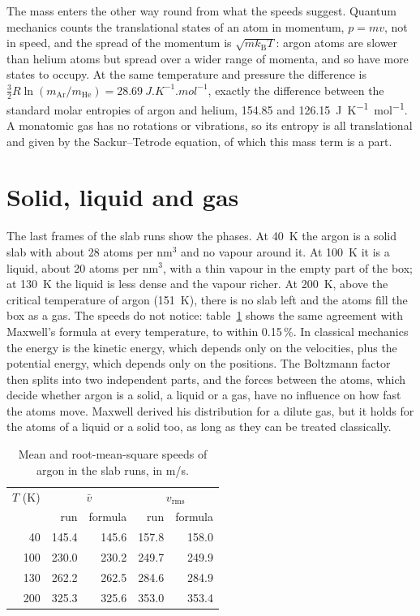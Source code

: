 The mass enters the other way round from what the speeds suggest. Quantum mechanics counts the translational states of an atom in momentum, $p = mv$, not in speed, and the spread of the momentum is $\sqrt{mk_\mathrm{B}T}$: argon atoms are slower than helium atoms but spread over a wider range of momenta, and so have more states to occupy. At the same temperature and pressure the difference is $\tfrac{3}{2}R\ln(m_\mathrm{Ar}/m_\mathrm{He}) = \SI{28.69}{J.K^{-1}.mol^{-1}}$, exactly the difference between the standard molar entropies of argon and helium, 154.85 and \SI{126.15}{J.K^{-1}.mol^{-1}}. A monatomic gas has no rotations or vibrations, so its entropy is all translational and given by the Sackur--Tetrode equation, of which this mass term is a part.

\section{Solid, liquid and gas}
The last frames of the slab runs show the phases. At \SI{40}{K} the argon is a solid slab with about 28 atoms per nm$^3$ and no vapour around it. At \SI{100}{K} it is a liquid, about 20 atoms per nm$^3$, with a thin vapour in the empty part of the box; at \SI{130}{K} the liquid is less dense and the vapour richer. At \SI{200}{K}, above the critical temperature of argon (\SI{151}{K}), there is no slab left and the atoms fill the box as a gas. The speeds do not notice: table~\ref{tab:maxwell-slab} shows the same agreement with Maxwell's formula at every temperature, to within 0.15\,\%. In classical mechanics the energy is the kinetic energy, which depends only on the velocities, plus the potential energy, which depends only on the positions. The Boltzmann factor then splits into two independent parts, and the forces between the atoms, which decide whether argon is a solid, a liquid or a gas, have no influence on how fast the atoms move. Maxwell derived his distribution for a dilute gas, but it holds for the atoms of a liquid or a solid too, as long as they can be treated classically.

\begin{table}[htbp]
	\centering
	\caption{Mean and root-mean-square speeds of argon in the slab runs, in m/s.}
	\label{tab:maxwell-slab}
	\begin{tabular}{rrrrr}
		\toprule
		$T$ (K) & \multicolumn{2}{c}{$\bar v$} & \multicolumn{2}{c}{$v_\mathrm{rms}$} \\
		 & run & formula & run & formula \\
		\midrule
		40 & 145.4 & 145.6 & 157.8 & 158.0 \\
		100 & 230.0 & 230.2 & 249.7 & 249.9 \\
		130 & 262.2 & 262.5 & 284.6 & 284.9 \\
		200 & 325.3 & 325.6 & 353.0 & 353.4 \\
		\bottomrule
	\end{tabular}
\end{table}

